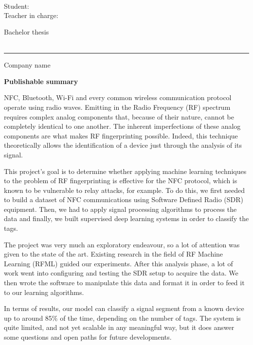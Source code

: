 \begin{flushright}
  \TBdpt\\
  \TBfiliere\\
  \TBorient\\
  Student: \TBauthor\\
  Teacher in charge: \TBsupervisor\\
\end{flushright}

\vspace{0.6cm}

\begin{center}
  {\large Bachelor thesis \TBacademicYears \\[0.2cm]}
  {\TBtitle \\[0.5cm]}
\end{center}

\hrule
\vspace{0.5cm}

{Company name}

\TBindustryName

\vspace{0.5cm}

{\bfseries Publishable summary}

{
  NFC, Bluetooth, Wi-Fi and every common wireless communication protocol operate using radio waves. Emitting in the Radio Frequency (RF) spectrum requires complex analog components that, because of their nature, cannot be completely identical to one another. The inherent imperfections of these analog components are what makes RF fingerprinting possible. Indeed, this technique theoretically allows the identification of a device just through the analysis of its signal.

  This project's goal is to determine whether applying machine learning techniques to the problem of RF fingerprinting is effective for the NFC protocol, which is known to be vulnerable to relay attacks, for example. To do this, we first needed to build a dataset of NFC communications using Software Defined Radio (SDR) equipment. Then, we had to apply signal processing algorithms to process the data and finally, we built supervised deep learning systems in order to classify the tags.

  The project was very much an exploratory endeavour, so a lot of attention was given to the state of the art. Existing research in the field of RF Machine Learning (RFML) guided our experiments. After this analysis phase, a lot of work went into configuring and testing the SDR setup to acquire the data. We then wrote the software to manipulate this data and format it in order to feed it to our learning algorithms.

  In terms of results, our model can classify a signal segment from a known device up to around 85\% of the time, depending on the number of tags. The system is quite limited, and not yet scalable in any meaningful way, but it does answer some questions and open paths for future developments.
}
